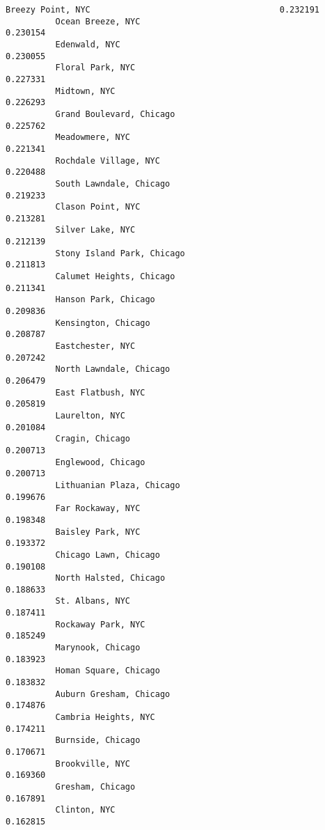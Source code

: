 \documentclass[11pt]{article}
\begin{document}
\begin{Verbatim}[commandchars=\\\{\}]
          Breezy Point, NYC                                      0.232191
          Ocean Breeze, NYC                                      0.230154
          Edenwald, NYC                                          0.230055
          Floral Park, NYC                                       0.227331
          Midtown, NYC                                           0.226293
          Grand Boulevard, Chicago                               0.225762
          Meadowmere, NYC                                        0.221341
          Rochdale Village, NYC                                  0.220488
          South Lawndale, Chicago                                0.219233
          Clason Point, NYC                                      0.213281
          Silver Lake, NYC                                       0.212139
          Stony Island Park, Chicago                             0.211813
          Calumet Heights, Chicago                               0.211341
          Hanson Park, Chicago                                   0.209836
          Kensington, Chicago                                    0.208787
          Eastchester, NYC                                       0.207242
          North Lawndale, Chicago                                0.206479
          East Flatbush, NYC                                     0.205819
          Laurelton, NYC                                         0.201084
          Cragin, Chicago                                        0.200713
          Englewood, Chicago                                     0.200713
          Lithuanian Plaza, Chicago                              0.199676
          Far Rockaway, NYC                                      0.198348
          Baisley Park, NYC                                      0.193372
          Chicago Lawn, Chicago                                  0.190108
          North Halsted, Chicago                                 0.188633
          St. Albans, NYC                                        0.187411
          Rockaway Park, NYC                                     0.185249
          Marynook, Chicago                                      0.183923
          Homan Square, Chicago                                  0.183832
          Auburn Gresham, Chicago                                0.174876
          Cambria Heights, NYC                                   0.174211
          Burnside, Chicago                                      0.170671
          Brookville, NYC                                        0.169360
          Gresham, Chicago                                       0.167891
          Clinton, NYC                                           0.162815

\end{Verbatim}
\end{document}
